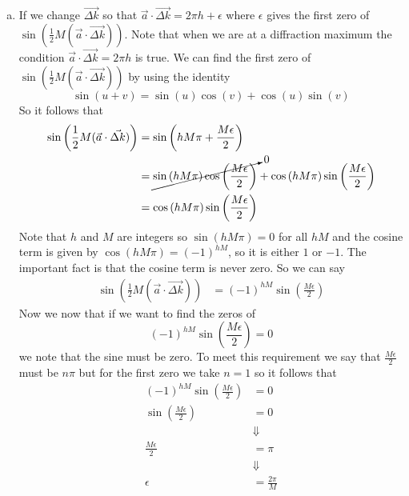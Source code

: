 \documentclass[11pt]{article}
\numberwithin{equation}{section}
\begin{document}
\begin{enumerate}[(a)]
\item
If we change $\vec{\Delta k}$ so that $\vec{a}\cdot\vec{\Delta k} = 2\pi h +\epsilon$ where $\epsilon$ gives the first zero of $\sin\left(\frac{1}{2}M(\vec{a}\cdot\vec{\Delta k})\right)$. Note that when we are at a diffraction maximum the condition $\vec{a}\cdot\vec{\Delta k} = 2\pi h$ is true. We can find the first zero of $\sin\left(\frac{1}{2}M(\vec{a}\cdot\vec{\Delta k})\right)$ by using the identity 
$$\sin(u+v) = \sin(u)\cos(v) + \cos(u)\sin(v)$$
So it follows that
\begin{align*}
\sin\left(\frac{1}{2}M(\vec{a}\cdot\vec{\Delta k})\right) &= \sin\left(hM\pi + \frac{M\epsilon}{2}\right) \\ 
&= \cancelto{0}{\sin\left(hM\pi\right)\cos\left(\frac{M\epsilon}{2}\right)} + \cos\left(hM\pi\right)\sin\left(\frac{M\epsilon}{2}\right) \\ 
&= \cos\left(hM\pi\right)\sin\left(\frac{M\epsilon}{2}\right) \\ 
\end{align*}
Note that $h$ and $M$ are integers so $\sin(hM\pi) = 0$ for all $hM$ and the cosine term is given by $\cos(hM\pi) = (-1)^{hM}$, so it is either $1$ or $-1$. The important fact is that the cosine term is never zero. So we can say
\begin{align*}
\sin\left(\frac{1}{2}M(\vec{a}\cdot\vec{\Delta k})\right) &= (-1)^{hM}\sin\left(\frac{M\epsilon}{2}\right)
\end{align*}
Now we now that if we want to find the zeros of
$$(-1)^{hM}\sin\left(\frac{M\epsilon}{2}\right) = 0$$
we note that the sine must be zero. To meet this requirement we say that $\frac{M\epsilon}{2}$ must be $n\pi$ but for the first zero we take $n=1$ so it follows that
\begin{align*}
(-1)^{hM}\sin\left(\frac{M\epsilon}{2}\right) &= 0\\
\sin\left(\frac{M\epsilon}{2}\right) &= 0\\
&\Downarrow\\
\frac{M\epsilon}{2} &= \pi\\
&\Downarrow\\
\epsilon &= \frac{2\pi}{M} 
\end{align*}
\end{enumerate}
\end{document}
